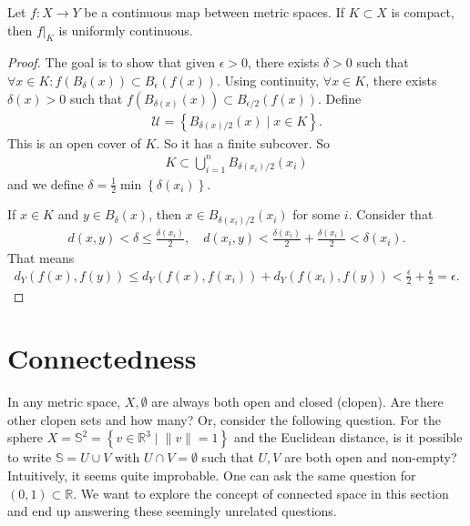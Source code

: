\begin{prop}\label{prop:unif_cont}
	Let $f: X \to Y$ be a continuous map between metric spaces. If $K \subset X$ is compact, then $f|_{K}$ is uniformly continuous.
\end{prop}
\begin{proof}
	The goal is to show that given $\epsilon > 0$, there exists $\delta > 0$ such that $\forall x \in K: f(B_{\delta}(x)) \subset B_{\epsilon}(f(x))$. Using continuity, $\forall x \in K$, there exists $\delta(x) > 0$ such that $f(B_{\delta(x)}(x)) \subset B_{\epsilon/2}(f(x))$. Define
	\begin{align*}
		\mathcal{U} = \left\{ B_{{\delta(x)}/{2}}(x) \mid x \in K \right\}.
	\end{align*}
	This is an open cover of $K$. So it has a finite subcover. So 
	\begin{align*}
		K \subset \bigcup_{i=1}^{n} B_{{\delta(x_{i})}/{2}}(x_{i})
	\end{align*}
	and we define $\delta = \frac{1}{2}\min\left\{ {\delta(x_{i})} \right\}$. 

	If $x \in K$ and $y \in B_{\delta}(x)$, then $x \in B_{\delta(x_{i}) / 2}(x_{i})$ for some $i$. Consider that 
	\begin{align*}
		d(x,y) < \delta \leq \frac{\delta(x_{i})}{2} , \quad d(x_{i}, y) < \frac{\delta(x_{i})}{2} + \frac{\delta(x_{i})}{2} < \delta(x_{i}).
	\end{align*}
	That means
	\begin{align*}
		d_{Y}(f(x),f(y)) \leq d_{Y}(f(x),f(x_{i})) + d_{Y}(f(x_{i}), f(y)) < \frac{\epsilon}{2} + \frac{\epsilon}{2} = \epsilon.
	\end{align*}
	
\end{proof}

\section{Connectedness}

In any metric space, $X, \emptyset$ are always both open and closed (clopen). Are there other clopen sets and how many? Or, consider the following question. For the sphere $X = \mathbb{S}^{2} = \left\{ v \in \mathbb{R}^{3} \mid \lVert v \rVert = 1 \right\}$ and the Euclidean distance, is it possible to write $\mathbb{S} = U \cup V$ with $U \cap V = \emptyset$ such that $U, V$ are both open and non-empty? Intuitively, it seems quite improbable. One can ask the same question for $(0,1) \subset \mathbb{R}$. We want to explore the concept of connected space in this section and end up answering these seemingly unrelated questions.


